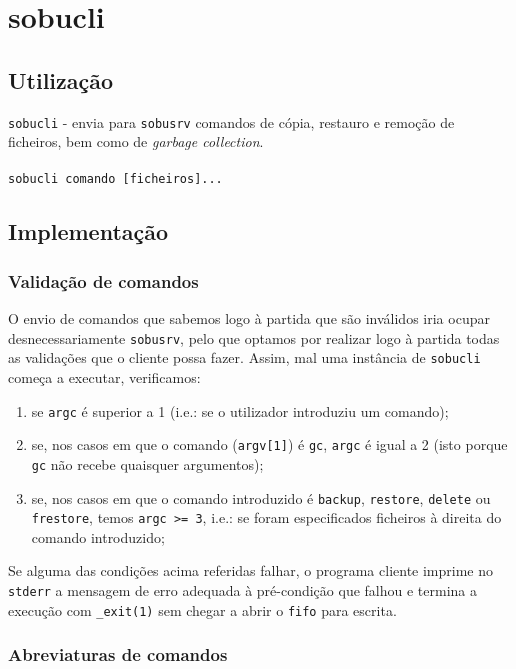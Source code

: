 \documentclass[a4paper,12pt,titlepage,portuguese]{article}
\begin{document}
\section{sobucli}

\subsection{Utilização}

\texttt{sobucli} - envia para \texttt{sobusrv} comandos de cópia, restauro e remoção de ficheiros, bem como de \emph{garbage collection}.
\\\\\texttt{sobucli comando [ficheiros]...}

\subsection{Implementação}

\subsubsection{Validação de comandos}

O envio de comandos que sabemos logo à partida que são inválidos iria ocupar desnecessariamente \texttt{sobusrv}, pelo que optamos por realizar logo à partida todas as validações que o cliente possa fazer. Assim, mal uma instância de \texttt{sobucli} começa a executar, verificamos:

	\begin{enumerate}
		\item se \texttt{argc} é superior a 1 (i.e.: se o utilizador introduziu um comando);
		\item se, nos casos em que o comando (\texttt{argv[1]}) é \texttt{gc}, \texttt{argc} é igual a 2 (isto porque \texttt{gc} não recebe quaisquer argumentos);
		\item se, nos casos em que o comando introduzido é \texttt{backup}, \texttt{restore}, \texttt{delete} ou \texttt{frestore}, temos \texttt{argc >= 3}, i.e.: se foram especificados ficheiros à direita do comando introduzido;
	\end{enumerate}
Se alguma das condições acima referidas falhar, o programa cliente imprime no \texttt{stderr} a mensagem de erro adequada à pré-condição que falhou e termina a execução com \texttt{\_exit(1)} sem chegar a abrir o \texttt{fifo} para escrita.

\subsubsection{Abreviaturas de comandos} \label{Abreviaturas de comandos}
\end{document}
